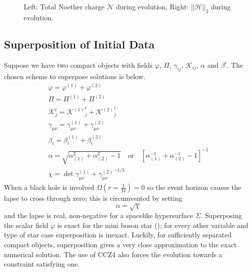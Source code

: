 \documentclass[11pt, oneside]{report}  %
\newcommand{\K}{\mathcal{K}}
\newcommand{\vp}{\varphi}
\numberwithin{equation}{section}
\begin{document}
  \begin{figure}[H]
  \caption{Left: Total Noether charge $\mathcal{N}$ during evolution, Right: $|| \mathcal{H} ||_2$ during evolution.}
  \centering
  \hfill
\end{figure}

\subsection{Superposition of Initial Data}
Suppose we have two compact objects with fields $\vp$, $\Pi$, $\gamma_{ij}$, $\K_{ij}$, $\alpha$ and $\beta^i$. The chosen scheme to superpose solutions is below.
\begin{gather*} \vp = \vp^{(1)} + \vp^{(2)}\\
\Pi = \Pi^{(1)} + \Pi^{(2)}\\
 \K^i_j = {\K^{(1)}}^i_j+{\K^{(2)}}^i_j\\
 \gamma_{\mu\nu} = \gamma^{(1)}_{\mu\nu} + \gamma^{(2)}_{\mu\nu}\\
\beta_i = \beta^{(1)}_i + \beta^{(2)}_i \\
 \alpha = \sqrt{\alpha_{(1)}^2 + \alpha_{(2)}^2-1} \quad \mathrm{or}\quad \left[ \alpha_{(1)}^{-1} +  \alpha_{(2)}^{-1}-1\right]^{-1}\\
 \chi = \det{\gamma^{(1)}_{\mu\nu} + \gamma^{(2)}_{\mu\nu}}^{-1/3}\end{gather*}
When a black hole is involved $\Omega(r=\frac{2}{M})=0$ so the event horizon causes the lapse to cross through zero; this is circumvented by setting
\begin{equation} \alpha = \sqrt{\chi}\end{equation}
and the lapse is real, non-negative for a spacelike hypersurface $\Sigma$. Superposing the scalar field $\vp$ is exact for the mini boson star (); for every other variable and type of star case superposition is inexact. Luckily, for sufficiently separated compact objects, superposition gives a very close approximation to the exact numerical solution. The use of CCZ4 also forces the evolution towards a constraint satisfying one. 
\end{document}
